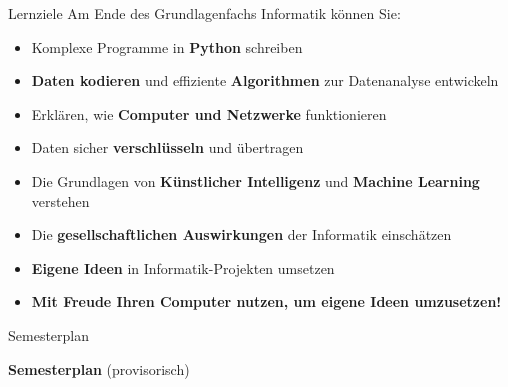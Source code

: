 \begin{frame}{Lernziele}
    Am Ende des Grundlagenfachs Informatik können Sie:
    \small
    \begin{itemize}[<+->]
        \item[\faCheckSquare] Komplexe Programme in \textbf{Python} schreiben
        \item[\faCheckSquare] \textbf{Daten kodieren} und effiziente \textbf{Algorithmen} zur Datenanalyse entwickeln
        \item[\faCheckSquare] Erklären, wie \textbf{Computer und Netzwerke} funktionieren
        \item[\faCheckSquare] Daten sicher \textbf{verschlüsseln} und übertragen
        \item[\faCheckSquare] Die Grundlagen von \textbf{Künstlicher Intelligenz} und \textbf{Machine Learning} verstehen
        \item[\faCheckSquare] Die \textbf{gesellschaftlichen Auswirkungen} der Informatik einschätzen
        \item[\faCheckSquare] \textbf{Eigene Ideen} in Informatik-Projekten umsetzen
        \item[\faCheckSquare] \textcolor{FDUblue}{\textbf{Mit Freude Ihren Computer nutzen, um eigene Ideen umzusetzen!}}
    \end{itemize}
\end{frame}

\begin{frame}
\end{frame}

\begin{frame}{Semesterplan}
    \begin{center}
        \faFileExcel{} \textbf{Semesterplan} (provisorisch)
    \end{center}
\end{frame}

\begin{frame}
\end{frame}

